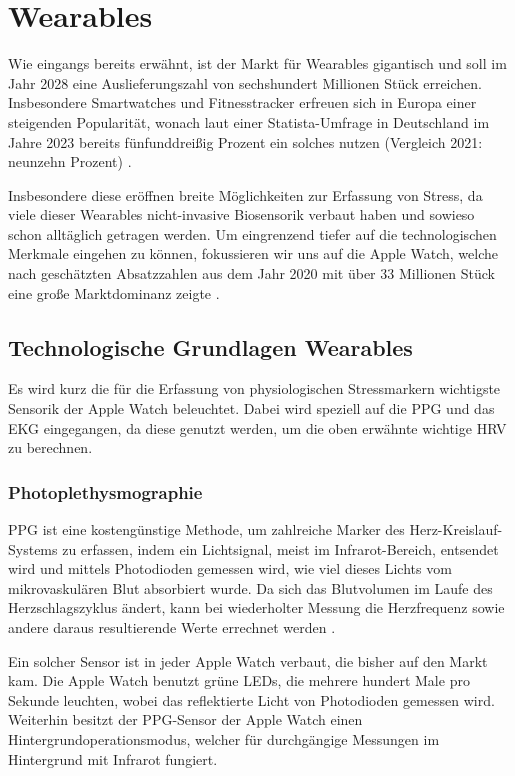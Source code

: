 \section{Wearables}

Wie eingangs bereits erwähnt, ist der Markt für Wearables gigantisch und soll im Jahr 2028 eine Auslieferungszahl von sechshundert Millionen Stück erreichen. Insbesondere Smartwatches und Fitnesstracker erfreuen sich in Europa einer steigenden Popularität, wonach laut einer Statista-Umfrage in Deutschland im Jahre 2023 bereits fünfunddreißig Prozent ein solches nutzen (Vergleich 2021: neunzehn Prozent) \cite{bocksch2023nutzung}.

Insbesondere diese eröffnen breite Möglichkeiten zur Erfassung von Stress, da viele dieser Wearables nicht-invasive Biosensorik verbaut haben und sowieso schon alltäglich getragen werden. Um eingrenzend tiefer auf die technologischen Merkmale eingehen zu können, fokussieren wir uns auf die Apple Watch, welche nach geschätzten Absatzzahlen aus dem Jahr 2020 mit über 33 Millionen Stück eine große Marktdominanz zeigte \cite{bocksch2021apple}.

\subsection{Technologische Grundlagen Wearables}

Es wird kurz die für die Erfassung von physiologischen Stressmarkern wichtigste Sensorik der Apple Watch beleuchtet. Dabei wird speziell auf die \ac{PPG} und das \ac{EKG} eingegangen, da diese genutzt werden, um die oben erwähnte wichtige \ac{HRV} zu berechnen.

\subsubsection{Photoplethysmographie}
\ac{PPG} ist eine kostengünstige Methode, um zahlreiche Marker des Herz-Kreislauf-Systems zu erfassen, indem ein Lichtsignal, meist im Infrarot-Bereich, entsendet wird und mittels Photodioden gemessen wird, wie viel dieses Lichts vom mikrovaskulären Blut absorbiert wurde. Da sich das Blutvolumen im Laufe des Herzschlagszyklus ändert, kann bei wiederholter Messung die Herzfrequenz sowie andere daraus resultierende Werte errechnet werden \cite{Allen2007}.

Ein solcher Sensor ist in jeder Apple Watch verbaut, die bisher auf den Markt kam. Die Apple Watch benutzt grüne LEDs, die mehrere hundert Male pro Sekunde leuchten, wobei das reflektierte Licht von Photodioden gemessen wird. Weiterhin besitzt der \ac{PPG}-Sensor der Apple Watch einen Hintergrundoperationsmodus, welcher für durchgängige Messungen im Hintergrund mit Infrarot fungiert.

